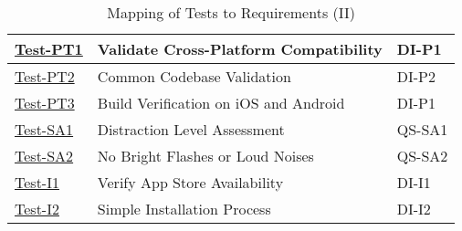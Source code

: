 \documentclass[12pt, titlepage]{article}
\begin{document}
\begin{table}[htpb!]
\begin{tabular}{|l|p{8cm}|p{3cm}|}
    \hline
    \hyperref[itm:Test-PT1]{Test-PT1} & Validate Cross-Platform Compatibility & DI-P1  \\
    \hline
    \hyperref[itm:Test-PT2]{Test-PT2} & Common Codebase Validation            & DI-P2  \\
    \hline
    \hyperref[itm:Test-PT3]{Test-PT3} & Build Verification on iOS and Android & DI-P1  \\
    \hline
    \hyperref[itm:Test-SA1]{Test-SA1} & Distraction Level Assessment          & QS-SA1 \\
    \hline
    \hyperref[itm:Test-SA2]{Test-SA2} & No Bright Flashes or Loud Noises      & QS-SA2 \\
    \hline
    \hyperref[itm:Test-I1]{Test-I1}   & Verify App Store Availability         & DI-I1  \\
    \hline
    \hyperref[itm:Test-I2]{Test-I2}   & Simple Installation Process           & DI-I2  \\
    \hline
  \end{tabular}
  \caption{Mapping of Tests to Requirements (II)}
  \label{tab:test_requirements2}
\end{table}
\end{document}
